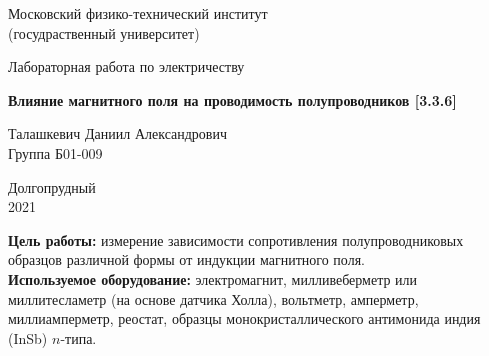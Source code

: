 \documentclass[a4paper, 12pt]{article}%
\begin{document}


\begin{titlepage}

	\newpage
	\begin{center}
		\normalsize Московский физико-технический институт \\(госудраственный 			университет)
	\end{center}

	\vspace{6em}

	\begin{center}
		\Large Лабораторная работа по электричеству\\
	\end{center}

	\vspace{1em}

	\begin{center}
		\large \textbf{Влияние магнитного поля на проводимость полупроводников [3.3.6]}
	\end{center}

	\vspace{2em}

	\begin{center}
		\large Талашкевич Даниил Александрович\\
		Группа Б01-009
	\end{center}

	\vspace{\fill}

	\begin{center}
	Долгопрудный \\2021
	\end{center}
	
\end{titlepage}



	\thispagestyle{empty}
	\newpage
	\tableofcontents
	\newpage
	\setcounter{page}{1}


					
\textbf{Цель работы:} измерение зависимости сопротивления полупроводниковых образцов различной формы от индукции магнитного поля. \\

\textbf{Используемое оборудование:} электромагнит, милливеберметр или миллитесламетр (на основе датчика Холла), вольтметр, амперметр, миллиамперметр, реостат, образцы монокристаллического антимонида индия (InSb) $n$-типа.
                    
\end{document}
